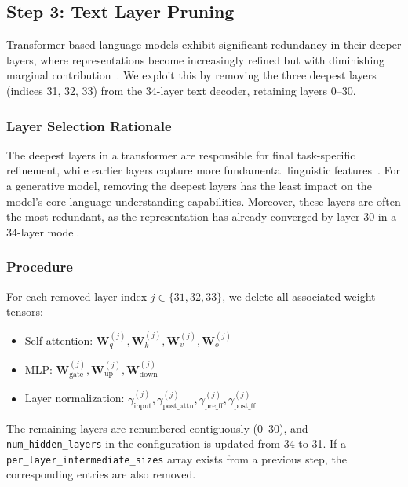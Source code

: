 \documentclass[11pt]{article}
\begin{document}
\subsection{Step 3: Text Layer Pruning}
\label{sec:layerprune}

Transformer-based language models exhibit significant redundancy in their deeper layers, where representations become increasingly refined but with diminishing marginal contribution~\citep{layerpruning}. We exploit this by removing the three deepest layers (indices 31, 32, 33) from the 34-layer text decoder, retaining layers 0--30.

\subsubsection{Layer Selection Rationale}

The deepest layers in a transformer are responsible for final task-specific refinement, while earlier layers capture more fundamental linguistic features~\citep{probing}. For a generative model, removing the deepest layers has the least impact on the model's core language understanding capabilities. Moreover, these layers are often the most redundant, as the representation has already converged by layer 30 in a 34-layer model.

\subsubsection{Procedure}

For each removed layer index $j \in \{31, 32, 33\}$, we delete all associated weight tensors:
\begin{itemize}[leftmargin=*]
    \item Self-attention: $\mathbf{W}_q^{(j)}, \mathbf{W}_k^{(j)}, \mathbf{W}_v^{(j)}, \mathbf{W}_o^{(j)}$
    \item MLP: $\mathbf{W}_{\text{gate}}^{(j)}, \mathbf{W}_{\text{up}}^{(j)}, \mathbf{W}_{\text{down}}^{(j)}$
    \item Layer normalization: $\gamma_{\text{input}}^{(j)}, \gamma_{\text{post\_attn}}^{(j)}, \gamma_{\text{pre\_ff}}^{(j)}, \gamma_{\text{post\_ff}}^{(j)}$
\end{itemize}

The remaining layers are renumbered contiguously (0--30), and \texttt{num\_hidden\_layers} in the configuration is updated from 34 to 31. If a \texttt{per\_layer\_intermediate\_sizes} array exists from a previous step, the corresponding entries are also removed.
\end{document}
